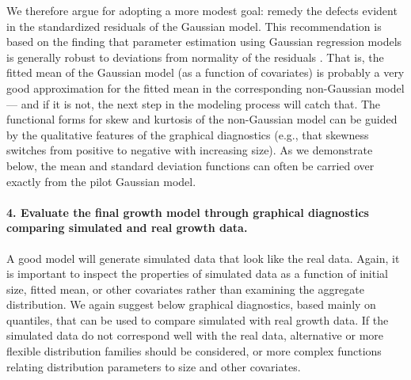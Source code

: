 \documentclass[12pt]{article}
\begin{document}
\begin{spacing}{1.9}
We therefore argue for adopting a more modest goal: remedy the defects evident in the standardized residuals of the Gaussian model. 
This recommendation is based on the finding that parameter estimation using Gaussian regression models is generally robust to deviations from normality of the residuals \citep{schielzeth2020robustness}. 
That is, the fitted mean of the Gaussian model (as a function of covariates) is probably a very good approximation for the fitted mean in the corresponding non-Gaussian model --- and if it is not, the next step in the modeling process will catch that. 
The functional forms for skew and kurtosis of the non-Gaussian model can be guided by the qualitative features of the graphical diagnostics (e.g., that skewness switches from positive to negative with increasing size). 
As we demonstrate below, the mean and standard deviation functions can often be carried over exactly from the pilot Gaussian model. 

\paragraph{4. Evaluate the final growth model through graphical diagnostics comparing simulated and real growth data.} 
A good model will generate simulated data that look like the real data.  
Again, it is important to inspect the properties of simulated data as a function of initial size, fitted mean, or other covariates rather than examining the aggregate distribution.   
We again suggest below graphical diagnostics, based mainly on quantiles, that can be used to compare simulated with real growth data. 
If the simulated data do not correspond well with the real data, alternative or more flexible distribution families should be considered, or more complex functions 
relating distribution parameters to size and other covariates. 


\end{spacing}
\end{document}
